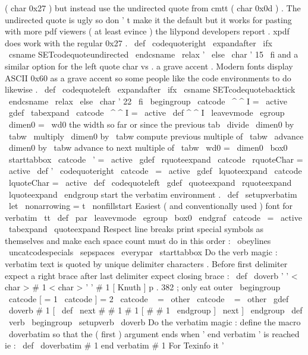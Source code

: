 {{(
char
0x27
)
but
instead
use
the
undirected
quote
%
from
cmtt
(
char
0x0d
)
.
The
undirected
quote
is
ugly
so
don
'
t
make
it
%
the
default
but
it
works
for
pasting
with
more
pdf
viewers
(
at
least
%
evince
)
the
lilypond
developers
report
.
xpdf
does
work
with
the
%
regular
0x27
.
%
\
def
\
codequoteright
{
%
\
expandafter
\
ifx
\
csname
SETcodequoteundirected
\
endcsname
\
relax
'
%
\
else
\
char
'
15
\
fi
}
%
%
and
a
similar
option
for
the
left
quote
char
vs
.
a
grave
accent
.
%
Modern
fonts
display
ASCII
0x60
as
a
grave
accent
so
some
people
like
%
the
code
environments
to
do
likewise
.
%
\
def
\
codequoteleft
{
%
\
expandafter
\
ifx
\
csname
SETcodequotebacktick
\
endcsname
\
relax
%
\
else
\
char
'
22
\
fi
}
%
\
begingroup
\
catcode
\
^
^
I
=
\
active
\
gdef
\
tabexpand
{
%
\
catcode
\
^
^
I
=
\
active
\
def
^
^
I
{
\
leavevmode
\
egroup
\
dimen0
=
\
wd0
%
the
width
so
far
or
since
the
previous
tab
\
divide
\
dimen0
by
\
tabw
\
multiply
\
dimen0
by
\
tabw
%
compute
previous
multiple
of
\
tabw
\
advance
\
dimen0
by
\
tabw
%
advance
to
next
multiple
of
\
tabw
\
wd0
=
\
dimen0
\
box0
\
starttabbox
}
%
}
\
catcode
\
'
=
\
active
\
gdef
\
rquoteexpand
{
\
catcode
\
rquoteChar
=
\
active
\
def
'
{
\
codequoteright
}
}
%
%
\
catcode
\
=
\
active
\
gdef
\
lquoteexpand
{
\
catcode
\
lquoteChar
=
\
active
\
def
{
\
codequoteleft
}
}
%
%
\
gdef
\
quoteexpand
{
\
rquoteexpand
\
lquoteexpand
}
%
\
endgroup
%
start
the
verbatim
environment
.
\
def
\
setupverbatim
{
%
\
let
\
nonarrowing
=
t
%
\
nonfillstart
%
Easiest
(
and
conventionally
used
)
font
for
verbatim
\
tt
\
def
\
par
{
\
leavevmode
\
egroup
\
box0
\
endgraf
}
%
\
catcode
\
=
\
active
\
tabexpand
\
quoteexpand
%
Respect
line
breaks
%
print
special
symbols
as
themselves
and
%
make
each
space
count
%
must
do
in
this
order
:
\
obeylines
\
uncatcodespecials
\
sepspaces
\
everypar
{
\
starttabbox
}
%
}
%
Do
the
verb
magic
:
verbatim
text
is
quoted
by
unique
%
delimiter
characters
.
Before
first
delimiter
expect
a
%
right
brace
after
last
delimiter
expect
closing
brace
:
%
%
\
def
\
doverb
'
{
'
<
char
>
#
1
<
char
>
'
}
'
{
#
1
}
%
%
[
Knuth
]
p
.
382
;
only
eat
outer
{
}
\
begingroup
\
catcode
[
=
1
\
catcode
]
=
2
\
catcode
\
{
=
\
other
\
catcode
\
}
=
\
other
\
gdef
\
doverb
{
#
1
[
\
def
\
next
#
#
1
#
1
}
[
#
#
1
\
endgroup
]
\
next
]
\
endgroup
%
\
def
\
verb
{
\
begingroup
\
setupverb
\
doverb
}
%
%
%
Do
the
verbatim
magic
:
define
the
macro
\
doverbatim
so
that
%
the
(
first
)
argument
ends
when
'
end
verbatim
'
is
reached
ie
:
%
%
\
def
\
doverbatim
#
1
end
verbatim
{
#
1
}
%
%
For
Texinfo
it
'
}}
